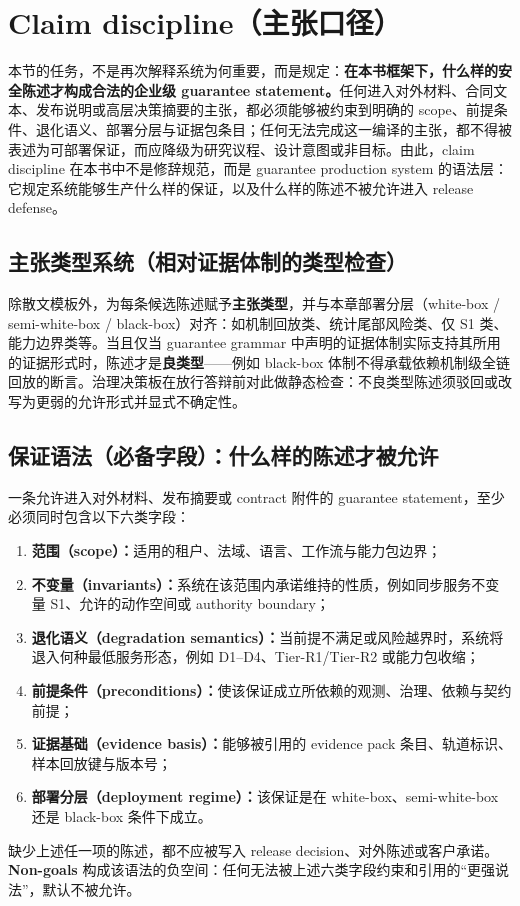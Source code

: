 \documentclass[11pt,a4paper]{report}
\begin{document}
\section{Claim discipline（主张口径）}
\noindent 本节的任务，不是再次解释系统为何重要，而是规定：\textbf{在本书框架下，什么样的安全陈述才构成合法的企业级 guarantee statement。}任何进入对外材料、合同文本、发布说明或高层决策摘要的主张，都必须能够被约束到明确的 scope、前提条件、退化语义、部署分层与证据包条目；任何无法完成这一编译的主张，都不得被表述为可部署保证，而应降级为研究议程、设计意图或非目标。由此，claim discipline 在本书中不是修辞规范，而是 guarantee production system 的语法层：它规定系统能够生产什么样的保证，以及什么样的陈述不被允许进入 release defense。

\subsection{主张类型系统（相对证据体制的类型检查）}
除散文模板外，为每条候选陈述赋予\textbf{主张类型}，并与本章部署分层（white-box / semi-white-box / black-box）对齐：如机制回放类、统计尾部风险类、仅 S1 类、能力边界类等。当且仅当 guarantee grammar 中声明的证据体制实际支持其所用的证据形式时，陈述才是\textbf{良类型}——例如 black-box 体制不得承载依赖机制级全链回放的断言。治理决策板在放行答辩前对此做静态检查：不良类型陈述须驳回或改写为更弱的允许形式并显式不确定性。

\subsection{保证语法（必备字段）：什么样的陈述才被允许}
一条允许进入对外材料、发布摘要或 contract 附件的 guarantee statement，至少必须同时包含以下六类字段：
\begin{enumerate}
  \item \textbf{范围（scope）：}适用的租户、法域、语言、工作流与能力包边界；
  \item \textbf{不变量（invariants）：}系统在该范围内承诺维持的性质，例如同步服务不变量 S1、允许的动作空间或 authority boundary；
  \item \textbf{退化语义（degradation semantics）：}当前提不满足或风险越界时，系统将退入何种最低服务形态，例如 D1--D4、Tier-R1/Tier-R2 或能力包收缩；
  \item \textbf{前提条件（preconditions）：}使该保证成立所依赖的观测、治理、依赖与契约前提；
  \item \textbf{证据基础（evidence basis）：}能够被引用的 evidence pack 条目、轨道标识、样本回放键与版本号；
  \item \textbf{部署分层（deployment regime）：}该保证是在 white-box、semi-white-box 还是 black-box 条件下成立。
\end{enumerate}
\noindent 缺少上述任一项的陈述，都不应被写入 release decision、对外陈述或客户承诺。\textbf{Non-goals} 构成该语法的负空间：任何无法被上述六类字段约束和引用的“更强说法”，默认不被允许。
\end{document}
